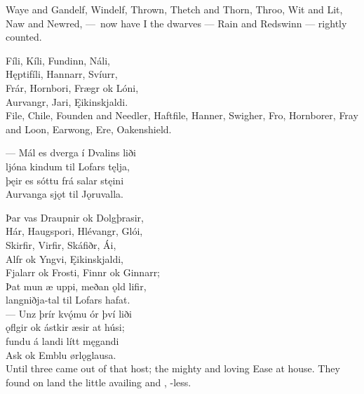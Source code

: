 \bvb Waye and Gandelf, Windelf, Thrown, Thetch and Thorn, Throo, Wit and Lit, Naw and Newred, — now have I the dwarves — Rain and Redswinn — rightly counted.

\bva Fíli, Kíli, \hld Fundinn, Náli, \\%
Hęptifíli, \hld Hannarr, Svíurr, \\%
Frár, Hornbori, \hld Frægr ok Lóni, \\%
Aurvangr, Jari, \hld Ęikinskjaldi.\\%

File, Chile, Founden and Needler, Haftfile, Hanner, Swigher, Fro, Hornborer, Fray and Loon, Earwong, Ere, Oakenshield.

\bva — Mál es dverga \hld í Dvalins liði \\%
ljóna kindum \hld til Lofars tęlja, \\%
þęir es sóttu \hld frá salar stęini \\%
Aurvanga sjǫt \hld til Jǫruvalla.\footnotemark[30] \\%

\bva Þar vas Draupnir \hld ok Dolgþrasir, \\%
Hár, Haugspori, \hld Hlévangr, Glói, \\%
Skirfir, Virfir, \hld Skáfiðr, Ái, \\%
Alfr ok Yngvi, \hld Ęikinskjaldi, \\%
Fjalarr ok Frosti, \hld Finnr ok Ginnarr; \\%
Þat mun æ uppi, \hld meðan ǫld lifir, \\%
langniðja-tal \hld til Lofars hafat.\\%

\bva — Unz þrír kvǫ́mu \hld ór því liði \\%
ǫflgir ok ástkir \hld æsir at húsi; \\%
fundu á landi \hld lítt męgandi \\%
Ask ok Emblu \hld ørlǫglausa.\\%

Until three came out of that host; the mighty and loving Ease at house. They found on land the little availing  and , -less.\footnotemark[1]

